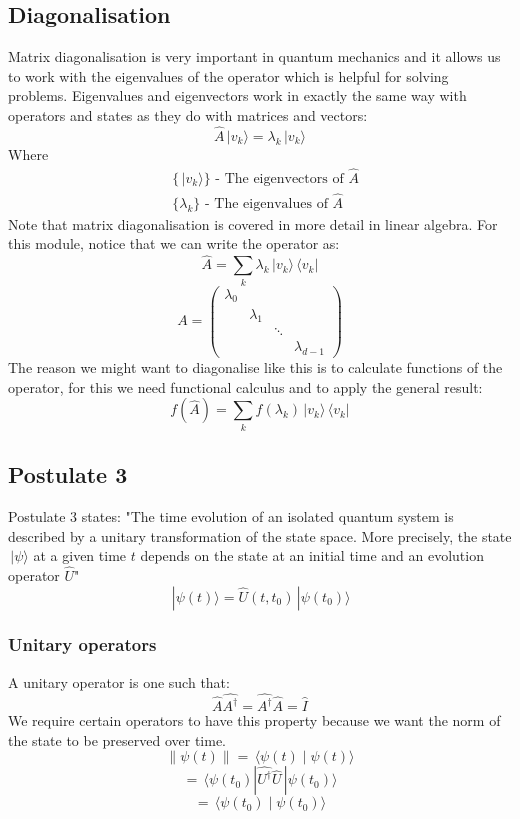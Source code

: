 \documentclass[12pt]{article}
\newcommand{\ket}[1]{\,|#1\rangle}
\newcommand{\bra}[1]{\,\langle #1|}
\newcommand{\braket}[2]{\,\langle #1\mid #2\rangle}
\begin{document}
\subsection*{Diagonalisation}
Matrix diagonalisation is very important in quantum mechanics and it allows us to work with the eigenvalues of the operator which is helpful for solving problems. Eigenvalues and eigenvectors work in exactly the same way with operators and states as they do with matrices and vectors:
\[\hat{A}\ket{v_k}=\lambda_k\ket{v_k}\]
Where
\begin{align*}
    &\{\ket{v_k}\}\text{ - The eigenvectors of }\hat{A} \\
    &\{\lambda_k\}\text{ - The eigenvalues of }\hat{A}
\end{align*}
Note that matrix diagonalisation is covered in more detail in linear algebra. For this module, notice that we can write the operator as:
\[\hat{A}=\sum_k\lambda_k\ket{v_k}\bra{v_k}\]
\[A=\begin{pmatrix}
    \lambda_0 \\
     & \lambda_1 \\
     & & \ddots \\
     & & & \lambda_{d-1}
\end{pmatrix}\]
The reason we might want to diagonalise like this is to calculate functions of the operator, for this we need functional calculus and to apply the general result:
\[f(\hat{A})=\sum_kf(\lambda_k)\ket{v_k}\bra{v_k}\]
\subsection*{Postulate 3}
Postulate 3 states: "The time evolution of an isolated quantum system is described by a unitary transformation of the state space. More precisely, the state \(\ket{\psi}\) at a given time \(t\) depends on the state at an initial time and an evolution operator \(\hat{U}\)"
\[\ket{\psi(t)}=\hat{U}(t,t_0)\ket{\psi(t_0)}\]
\subsubsection*{Unitary operators}
A unitary operator is one such that:
\[\hat{A}\hat{A^\dagger}=\hat{A^\dagger}\hat{A}=\hat{I}\]
We require certain operators to have this property because we want the norm of the state to be preserved over time.
\[\|\psi(t)\|=\braket{\psi(t)}{\psi(t)}\]
\[=\bra{\psi(t_0)}\hat{U^\dagger}\hat{U}\ket{\psi(t_0)}\]
\[=\braket{\psi(t_0)}{\psi(t_0)}\]
\end{document}
